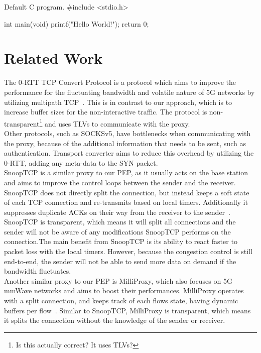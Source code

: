 \documentclass[a4paper,english, 11pt]{report}
\begin{document}
\begin{autonumlstlisting}[label=lst:hello_world]{Default C program.}
#include <stdio.h>

int main(void)
{
	printf("Hello World!");
	return 0;
}

\end{autonumlstlisting}

\section{Related Work}
The 0-RTT TCP Convert Protocol is a protocol which aims to improve the performance for the fluctuating bandwidth and volatile nature of 5G networks by utilizing multipath TCP~\cite{rfc8803}. This is in contrast to our approach, which is to increase buffer sizes for the non-interactive traffic. The protocol is non-transparent\footnote{Is this actually correct? It uses TLVs?} and uses TLVs to communicate with the proxy.\\

Other protocols, such as SOCKSv5, have bottlenecks when communicating with the proxy, because of the additional information that needs to be sent, such as authentication. Transport converter aims to reduce this overhead by utilizing the 0-RTT, adding any meta-data to the SYN packet.\\

SnoopTCP is a similar proxy to our PEP, as it usually acts on the base station and aims to improve the control loops between the sender and the receiver. SnoopTCP does not directly split the connection, but instead keeps a soft state of each TCP connection and re-transmits based on local timers. Additionally it suppresses duplicate ACKs on their way from the receiver to the sender~\cite{snooptcp}.\\

SnoopTCP is transparent, which means it will split all connections and the sender will not be aware of any modifications SnoopTCP performs on the connection.The main benefit from SnoopTCP is its ability to react faster to packet loss with the local timers. However, because the congestion control is still end-to-end, the sender will not be able to send more data on demand if the bandwidth fluctuates.\\

Another similar proxy to our PEP is MilliProxy, which also focuses on 5G mmWave networks and aims to boost their performances. MilliProxy operates with a split connection, and keeps track of each flows state, having dynamic buffers per flow~\cite{milliproxy}. Similar to SnoopTCP, MilliProxy is transparent, which means it splits the connection without the knowledge of the sender or receiver.\\
\end{document}
